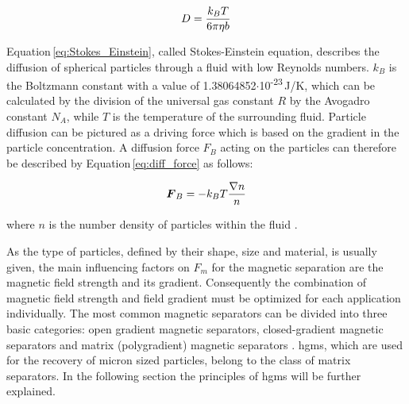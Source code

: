 \begin{equation}
\label{eq:Stokes_Einstein}
\centering
D = \frac{k_{B}T}{6\pi\eta b}
\end{equation}

Equation\,\ref{eq:Stokes_Einstein}, called Stokes-Einstein equation, describes the diffusion of spherical particles through a fluid with low Reynolds numbers. $k_{B}$ is the Boltzmann constant with a value of 1.38064852$\cdotp$10\textsuperscript{-23}\,J/K, which can be calculated by the division of the universal gas constant $R$ by the Avogadro constant $N_{A}$, while $T$ is the temperature of the surrounding fluid. Particle diffusion can be pictured as a driving force which is based on the gradient in the particle concentration. 
A diffusion force $F_{B}$ acting on the particles can therefore be described by Equation\,\ref{eq:diff_force} as follows:

\begin{equation}
\label{eq:diff_force}
\centering
\boldsymbol{F}_{B} = -k_{B}T\frac{\nabla n}{n}
\end{equation}

where $n$ is the number density of particles within the fluid \cite{choomphon2017simulation,moeser2004high,fletcher1991fine}. 

As the type of particles, defined by their shape, size and material, is usually given, the main influencing factors on $F_{m}$ for the magnetic separation are the magnetic field strength and its gradient. Consequently the combination of magnetic field strength and field gradient must be optimized for each application individually. The most common magnetic separators can be divided into three basic categories: open gradient magnetic separators, closed-gradient magnetic separators and matrix (polygradient) magnetic separators \cite{svoboda2004magnetic}. \Gls{hgms}, which are used for the recovery of micron sized particles, belong to the class of matrix separators. In the following section the principles of \gls{hgms} will be further explained.  


